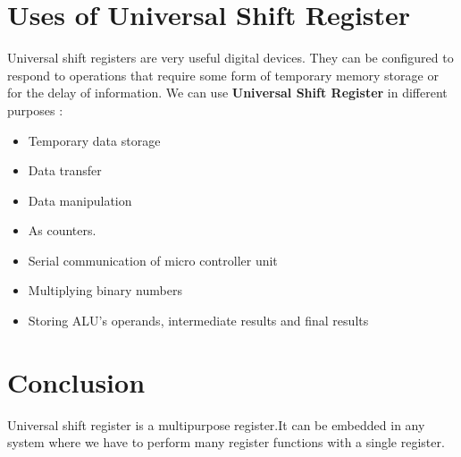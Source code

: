 \documentclass{article}
\begin{document}
\begin{flushleft}
\section{Uses of Universal Shift Register}
Universal shift registers are very useful digital devices. They can be configured to respond to operations that require some form of temporary memory storage or for the delay of information.
We can use \textbf{Universal Shift Register} in different purposes : \\
\begin{itemize}
\item Temporary data storage
\item Data transfer
\item Data manipulation
\item As counters.
\item Serial communication of micro controller unit
\item Multiplying binary numbers
\item Storing  ALU's operands, intermediate results and final results
\end{itemize}
\section{Conclusion}
Universal shift register is a multipurpose register.It can be embedded in any system where we have to perform  many register functions with a single register. 
\end{flushleft}
\end{document}
